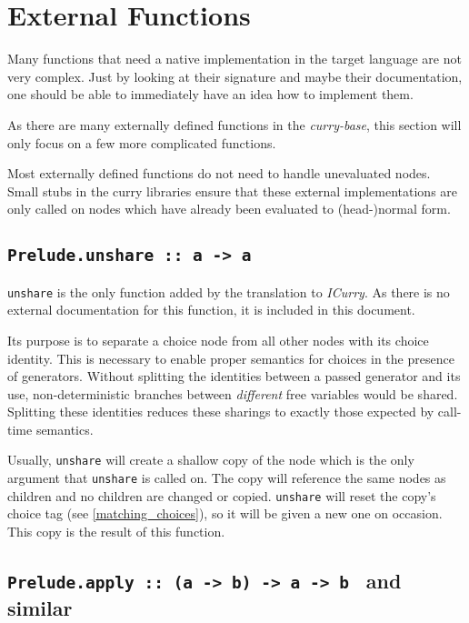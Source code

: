 \section{External Functions}

Many functions that need a native implementation in the target language are not very complex.
Just by looking at their signature and maybe their documentation, one should be able to immediately have an idea how to implement them.

As there are many externally defined functions in the \emph{curry-base}, this section will only focus on a few more complicated functions.

Most externally defined functions do not need to handle unevaluated nodes.
Small stubs in the curry libraries ensure that these external implementations are only called on nodes which have already been evaluated to (head-)normal form.

\subsection{\texttt{Prelude.unshare ::~a -> a}}
\label{unshare}

\texttt{unshare} is the only function added by the translation to \emph{ICurry}.
As there is no external documentation for this function, it is included in this document.

Its purpose is to separate a choice node from all other nodes with its choice identity.
This is necessary to enable proper semantics for choices in the presence of generators.
Without splitting the identities between a passed generator and its use, non-deterministic branches between \emph{different} free variables would be shared.
Splitting these identities reduces these sharings to exactly those expected by call-time semantics.

Usually, \texttt{unshare} will create a shallow copy of the node which is the only argument that \texttt{unshare} is called on.
The copy will reference the same nodes as children and no children are changed or copied.
\texttt{unshare} will reset the copy's choice tag (see \ref{matching_choices}), so it will be given a new one on occasion.
This copy is the result of this function.

\subsection{\texttt{Prelude.apply ::~(a -> b) -> a -> b } and similar}

